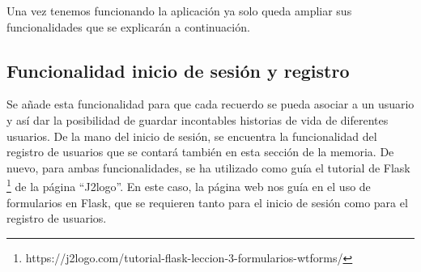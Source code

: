 Una vez tenemos funcionando la aplicación ya solo queda ampliar sus funcionalidades que se explicarán a continuación. 


\subsection{Funcionalidad inicio de sesión y registro}

Se añade esta funcionalidad para que cada recuerdo se pueda asociar a un usuario y así dar la posibilidad de guardar incontables historias de vida de diferentes usuarios. De la mano del inicio de sesión, se encuentra la funcionalidad del registro de usuarios que se contará también en esta sección de la memoria. De nuevo, para ambas funcionalidades, se ha utilizado como guía el tutorial de Flask \footnote{https://j2logo.com/tutorial-flask-leccion-3-formularios-wtforms/} de la página ``J2logo''. En este caso, la página web nos guía en el uso de formularios en Flask, que se requieren tanto para el inicio de sesión como para el registro de usuarios. 






